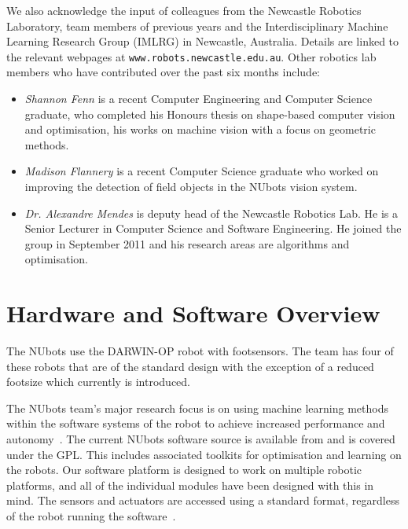 \documentclass{llncs}
\begin{document}
We also acknowledge the input of colleagues from the Newcastle Robotics Laboratory, team members of previous years
and the Interdisciplinary Machine Learning Research Group (IMLRG) in
Newcastle, Australia. Details are linked to the relevant webpages at
\texttt{www.robots.newcastle.edu.au}. Other robotics lab members who have contributed over the past six months include:
\begin{itemize}

\item \emph{Shannon Fenn} is a recent Computer Engineering and Computer Science graduate, who completed his Honours thesis on shape-based computer vision and optimisation, his works on machine vision with a focus on geometric methods.

\item \emph{Madison Flannery} is a recent Computer Science graduate who worked on improving the detection of field objects in the NUbots vision system.

\item \emph{Dr. Alexandre Mendes} is deputy head of the Newcastle Robotics
Lab. He is a Senior Lecturer in Computer Science and Software Engineering.
He joined the group in September 2011 and his research areas are algorithms and optimisation.

\end{itemize}



\section{Hardware and Software Overview}
The NUbots use the DARWIN-OP robot with footsensors. The team has four of these robots that are of the standard design with the exception of a reduced footsize which currently is introduced. %


The NUbots team's major research focus is on using machine learning methods within the software systems of the robot to achieve increased performance and autonomy~\cite{ChalupEtAlSMC2007}. The current NUbots software source is available from \cite{nubotsGit} and is covered under the GPL. This includes associated toolkits for optimisation and learning on the robots. Our software platform is designed to work on multiple robotic platforms, and all of the individual modules have been designed with this in mind. The sensors and actuators are accessed using a standard format, regardless of the robot running the software~\cite{Kulk2011c}. 
\end{document}
